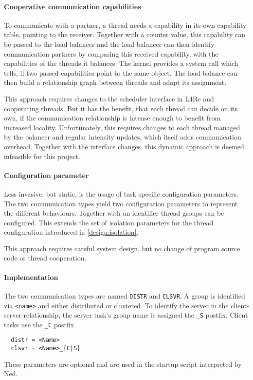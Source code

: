 \paragraph{Cooperative communication capabilities}
To communicate with a partner, a thread needs a capability in its own
capability table, pointing to the receiver.
Together with a counter value, this capability can be passed to the load
balancer and the load balancer can then identify communication partners
by comparing this received capability, with the capabilities of the threads
it balances.
The kernel provides a system call which tells, if two passed capabilities point
to the same object.
The load balance can then build a relationship graph between threads and adapt
its assignment.

This approach requires changes to the scheduler interface in L4Re and
cooperating threads.
But it has the benefit, that each thread can decide on its own, if the
communication relationship is intense enough to benefit from increased
locality.
Unfortunately, this requires changes to each thread managed by the balancer and
regular intensity updates, which itself adds communication overhead.
Together with the interface changes, this dynamic approach is deemed infeasible
for this project.

\paragraph{Configuration parameter}
Less invasive, but static, is the usage of task specific configuration parameters.
The two communication types yield two configuration parameters to represent the
different behaviours.
Together with an identifier thread groups can be configured.
This extends the set of isolation parameters for the thread configuration
introduced in \ref{design:isolation}.

This approach requires careful system design, but no change of program source
code or thread cooperation.

\paragraph{Implementation}
The two communication types are named \texttt{DISTR} and \texttt{CLSVR}.
A group is identified via \texttt{<name>} and either distributed or clustered.
To identify the server in the client-server relationship, the server task's
group name is assigned the \texttt{\_S} postfix.
Client tasks use the \texttt{\_C} postfix.

\begin{lstlisting}
  distr = <Name>
  clsvr = <Name>_{C|S}
\end{lstlisting}

These parameters are optional and are used in the startup script interpreted by
Ned.

